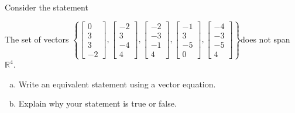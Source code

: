 
\begin{exerciseStatement}


Consider the statement 
\begin{center}\begin{minipage}{0.8\textwidth}
 The set of vectors \( \left\{ \left[\begin{array}{c}
0 \\
3 \\
3 \\
-2
\end{array}\right] , \left[\begin{array}{c}
-2 \\
3 \\
-4 \\
4
\end{array}\right] , \left[\begin{array}{c}
-2 \\
-3 \\
-1 \\
4
\end{array}\right] , \left[\begin{array}{c}
-1 \\
3 \\
-5 \\
0
\end{array}\right] , \left[\begin{array}{c}
-4 \\
-3 \\
-5 \\
4
\end{array}\right] \right\} \)does not span \(\mathbb{R}^4\). 
\end{minipage}\end{center}
    


\begin{enumerate}[(a)]
\item  Write an equivalent statement using a vector equation.
\item  Explain why your statement is true or false.
\end{enumerate}
    
\end{exerciseStatement}
    
